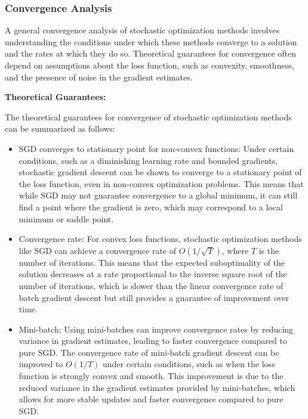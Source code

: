 \documentclass[
  letterpaper,
  DIV=11,
  numbers=noendperiod]{scrreprt}
\begin{document}
\subsubsection{Convergence Analysis}\label{convergence-analysis}

A general convergence analysis of stochastic optimization methods
involves understanding the conditions under which these methods converge
to a solution and the rates at which they do so. Theoretical guarantees
for convergence often depend on assumptions about the loss function,
such as convexity, smoothness, and the presence of noise in the gradient
estimates.

\textbf{Theoretical Guarantees:}

The theoretical guarantees for convergence of stochastic optimization
methods can be summarized as follows:

\begin{itemize}
\item
  SGD converges to stationary point for non-convex functions: Under
  certain conditions, such as a diminishing learning rate and bounded
  gradients, stochastic gradient descent can be shown to converge to a
  stationary point of the loss function, even in non-convex optimization
  problems. This means that while SGD may not guarantee convergence to a
  global minimum, it can still find a point where the gradient is zero,
  which may correspond to a local minimum or saddle point.
\item
  Convergence rate: For convex loss functions, stochastic optimization
  methods like SGD can achieve a convergence rate of \(O(1/\sqrt{T})\),
  where \(T\) is the number of iterations. This means that the expected
  suboptimality of the solution decreases at a rate proportional to the
  inverse square root of the number of iterations, which is slower than
  the linear convergence rate of batch gradient descent but still
  provides a guarantee of improvement over time.
\item
  Mini-batch: Using mini-batches can improve convergence rates by
  reducing variance in gradient estimates, leading to faster convergence
  compared to pure SGD. The convergence rate of mini-batch gradient
  descent can be improved to \(O(1/T)\) under certain conditions, such
  as when the loss function is strongly convex and smooth. This
  improvement is due to the reduced variance in the gradient estimates
  provided by mini-batches, which allows for more stable updates and
  faster convergence compared to pure SGD.
\end{itemize}
\end{document}
